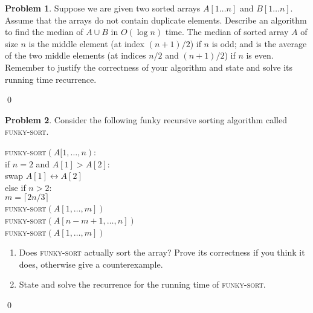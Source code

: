 \documentclass[12pt]{article}
\theoremstyle{definition}
\newtheorem{question}{Problem}
\newenvironment{solution}{\bigskip\noindent{\it Solution.}  \ignorespaces}{\hfill\qed}
\begin{document}
\newpage
\begin{question} 
Suppose we are given two sorted arrays $A[1 \ldots n]$ and $B[1 \ldots n]$. 
Assume that the arrays do not contain duplicate
elements. Describe an algorithm to find the median of $A \cup B$ in $O(\log n)$ time.
The median of sorted array $A$ of size $n$ is the middle element (at index $(n+1)/2$) if $n$ is odd; and is
the average of the two middle elements (at indices $n/2$ and $(n+1)/2$)
if $n$ is even.  Remember to {justify the correctness of your algorithm} 
and state and solve its running time recurrence.
\end{question}
\begin{solution}
\end{solution}


\newpage
\begin{question}
Consider the following funky recursive sorting algorithm called \textsc{funky-sort}.

\vspace{10pt}
\noindent
\textsc{funky-sort}$(A[1, \ldots, n)$:\\
\hspace*{5mm} if $n = 2$ and $A[1] > A[2]$:\\
\hspace*{5mm} \hspace*{6mm}swap $A[1] \leftrightarrow A[2]$\\
\hspace*{5mm} else if $n >2$:\\
\hspace*{5mm} \hspace*{6mm}$m = \lceil 2n/ 3 \rceil$\\
\hspace*{5mm} \hspace*{6mm}\textsc{funky-sort}$(A[1, \ldots, m])$\\
\hspace*{5mm} \hspace*{6mm}\textsc{funky-sort}$(A[n-m+1, \ldots, n])$\\
\hspace*{5mm} \hspace*{6mm}\textsc{funky-sort}$(A[1, \ldots, m])$

\begin{enumerate}[label = (\alph*), noitemsep]
    \item Does \textsc{funky-sort} actually sort the array?  Prove its correctness if you think it does, otherwise give a counterexample.
    \item State and solve the recurrence for the running time of \textsc{funky-sort}.
\end{enumerate}
\end{question}
\begin{solution}
\end{solution}
\end{document}
